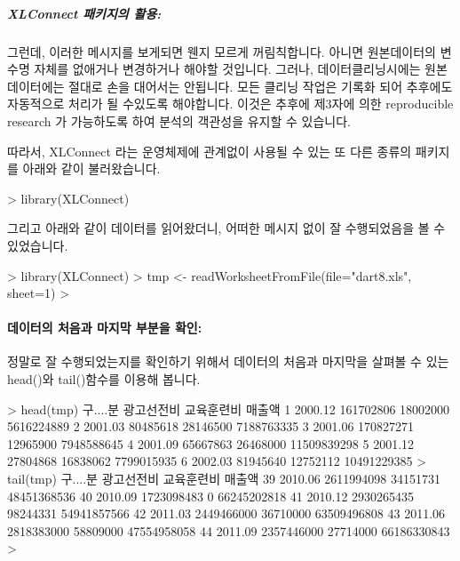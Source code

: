 \subparagraph{XLConnect 패키지의 활용:}
그런데, 이러한 메시지를 보게되면 웬지 모르게 꺼림칙합니다. 
아니면 원본데이터의 변수명 자체를 없애거나 변경하거나 해야할 것입니다.
그러나, 데이터클리닝시에는 원본 데이터에는 절대로 손을 대어서는 안됩니다.
모든 클리닝 작업은 기록화 되어 추후에도 자동적으로 처리가 될 수있도록 해야합니다.
이것은 추후에 제3자에 의한 reproducible research 가 가능하도록 하여 분석의 객관성을 유지할 수 있습니다.

따라서, XLConnect 라는 운영체제에 관계없이 사용될 수 있는 또 다른 종류의 패키지를 아래와 같이 불러왔습니다.

\begin{Schunk}
\begin{Soutput}
> library(XLConnect)
\end{Soutput}
\end{Schunk}

그리고 아래와 같이 데이터를 읽어왔더니, 어떠한 메시지 없이 잘 수행되었음을 볼 수 있었습니다. 

\begin{Schunk}
\begin{Soutput}
> library(XLConnect)
> tmp <- readWorksheetFromFile(file="dart8.xls", sheet=1)
> 
\end{Soutput}
\end{Schunk}

\paragraph{데이터의 처음과 마지막 부분을 확인:} 
정말로 잘 수행되었는지를 확인하기 위해서 데이터의 처음과 마지막을 살펴볼 수 있는 head()와 tail()함수를 이용해 봅니다.

\begin{Schunk}
\begin{Soutput}
> head(tmp)
  구....분 광고선전비 교육훈련비      매출액
1  2000.12  161702806   18002000  5616224889
2  2001.03   80485618   28146500  7188763335
3  2001.06  170827271   12965900  7948588645
4  2001.09   65667863   26468000 11509839298
5  2001.12   27804868   16838062  7799015935
6  2002.03   81945640   12752112 10491229385
> tail(tmp)
   구....분 광고선전비 교육훈련비      매출액
39  2010.06 2611994098   34151731 48451368536
40  2010.09 1723098483          0 66245202818
41  2010.12 2930265435   98244331 54941857566
42  2011.03 2449466000   36710000 63509496808
43  2011.06 2818383000   58809000 47554958058
44  2011.09 2357446000   27714000 66186330843
> 
\end{Soutput}
\end{Schunk}

